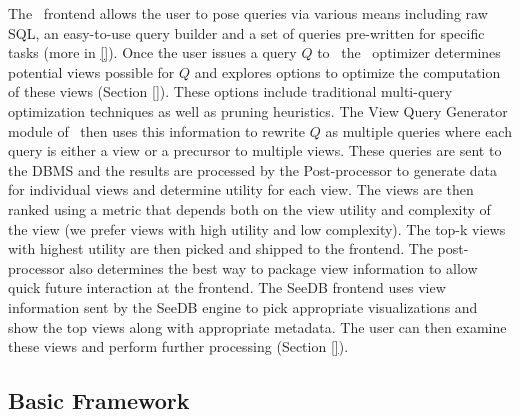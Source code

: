 The \SeeDB\ frontend allows the user to pose queries via various means including
raw SQL, an easy-to-use query builder and a set of queries pre-written for
specific tasks (more in \ref{}). Once the user issues a query $Q$ to \SeeDB\,
the \SeeDB\ optimizer determines potential views possible for $Q$ and explores
options to optimize the computation of these views (Section \ref{}). These
options include traditional multi-query optimization techniques as well as
pruning heuristics. The View Query Generator module of \SeeDB\ then uses this
information to rewrite $Q$ as multiple queries where each query is either a view
or a precursor to multiple views. These queries are sent to the DBMS and the
results are processed by the Post-processor to generate data for individual
views and determine utility for each view. The views are then ranked using a
metric that depends both on the view utility and complexity of the view (we
prefer views with high utility and low complexity). The top-k views with highest
utility are then picked and shipped to the frontend. The post-processor also
determines the best way to package view information to allow quick future
interaction at the frontend. The SeeDB frontend uses view information sent by
the SeeDB engine to pick appropriate visualizations and show the top views along
with appropriate metadata. The user can then examine these views and perform
further processing (Section \ref{}).

\subsection{Basic Framework}
\label{basic_framework}

